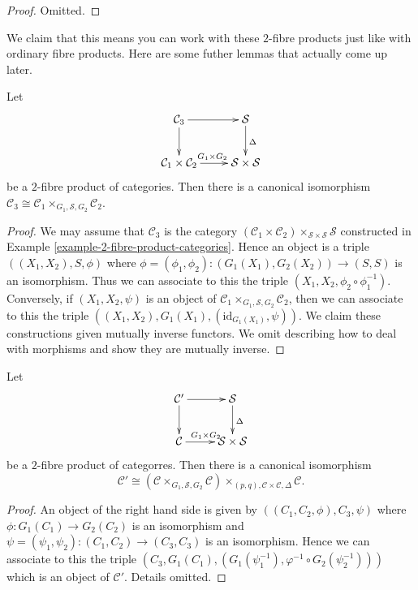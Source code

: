 \begin{proof}
Omitted.
\end{proof}

\noindent
We claim that this means you can work with these $2$-fibre products
just like with ordinary fibre products. Here are some futher lemmas
that actually come up later.

\begin{lemma}
\label{lemma-diagonal-1}
Let
$$
\xymatrix{
\mathcal{C}_3 \ar[r] \ar[d] & \mathcal{S} \ar[d]^\Delta \\
\mathcal{C}_1 \times \mathcal{C}_2 \ar[r]^{G_1 \times G_2} &
\mathcal{S} \times \mathcal{S}
}
$$
be a $2$-fibre product of categories.
Then there is a canonical isomorphism
$\mathcal{C}_3 \cong
\mathcal{C}_1 \times_{G_1, \mathcal{S}, G_2} \mathcal{C}_2$.
\end{lemma}

\begin{proof}
We may assume that $\mathcal{C}_3$ is the category
$(\mathcal{C}_1 \times \mathcal{C}_2)\times_{\mathcal{S} \times \mathcal{S}}
\mathcal{S}$ constructed in Example \ref{example-2-fibre-product-categories}.
Hence an object is a triple
$((X_1, X_2), S, \phi)$ where
$\phi = (\phi_1, \phi_2) : (G_1(X_1), G_2(X_2)) \to (S, S)$
is an isomorphism. Thus we can associate to this the triple
$(X_1, X_2, \phi_2 \circ \phi_1^{-1})$.
Conversely, if $(X_1, X_2, \psi)$ is an object of
$\mathcal{C}_1 \times_{G_1, \mathcal{S}, G_2} \mathcal{C}_2$,
then we can associate to this the triple
$((X_1, X_2), G_1(X_1), (\text{id}_{G_1(X_1)}, \psi))$.
We claim these constructions given mutually inverse functors.
We omit describing how to deal with morphisms
and show they are mutually inverse.
\end{proof}

\begin{lemma}
\label{lemma-diagonal-2}
Let
$$
\xymatrix{
\mathcal{C}' \ar[r] \ar[d] & \mathcal{S} \ar[d]^\Delta \\
\mathcal{C} \ar[r]^{G_1 \times G_2} &
\mathcal{S} \times \mathcal{S}
}
$$
be a $2$-fibre product of categorres.
Then there is a canonical isomorphism
$$
\mathcal{C}' \cong
(\mathcal{C} \times_{G_1, \mathcal{S}, G_2} \mathcal{C})
\times_{(p, q), \mathcal{C} \times \mathcal{C}, \Delta}
\mathcal{C}.
$$
\end{lemma}

\begin{proof}
An object of the right hand side is given by
$((C_1, C_2, \phi), C_3, \psi)$ where
$\phi : G_1(C_1) \to G_2(C_2)$ is an isomorphism
and $\psi = (\psi_1, \psi_2) : (C_1, C_2) \to (C_3, C_3)$ is
an isomorphism. Hence we can associate to this the triple
$(C_3, G_1(C_1), (G_1(\psi_1^{-1}), \varphi^{-1} \circ G_2(\psi_2^{-1})))$
which is an object of $\mathcal{C}'$.
Details omitted.
\end{proof}

